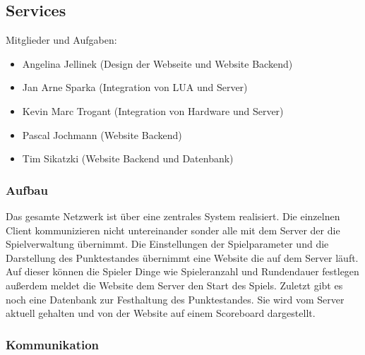 \subsection{Services}
\label{services}

Mitglieder und Aufgaben:
\begin{itemize}
  \item
    Angelina Jellinek (Design der Webseite und Website Backend)
  \item
    Jan Arne Sparka (Integration von LUA und Server)
  \item
    Kevin Marc Trogant (Integration von Hardware und Server)
  \item
    Pascal Jochmann (Website Backend)
  \item
    Tim Sikatzki (Website Backend und Datenbank)
\end{itemize}

\subsubsection{Aufbau}
Das gesamte Netzwerk ist über eine zentrales System realisiert. Die einzelnen 
Client kommunizieren nicht untereinander sonder alle mit dem Server der die Spielverwaltung übernimmt. 
Die Einstellungen der Spielparameter und die Darstellung des Punktestandes übernimmt eine Website die auf dem Server läuft. 
Auf dieser können die Spieler Dinge wie Spieleranzahl und Rundendauer festlegen außerdem meldet 
die Website dem Server den Start des Spiels. Zuletzt gibt es noch eine Datenbank zur Festhaltung des Punktestandes. 
Sie wird vom Server aktuell gehalten und von der Website auf einem Scoreboard dargestellt.

\subsubsection{Kommunikation}

